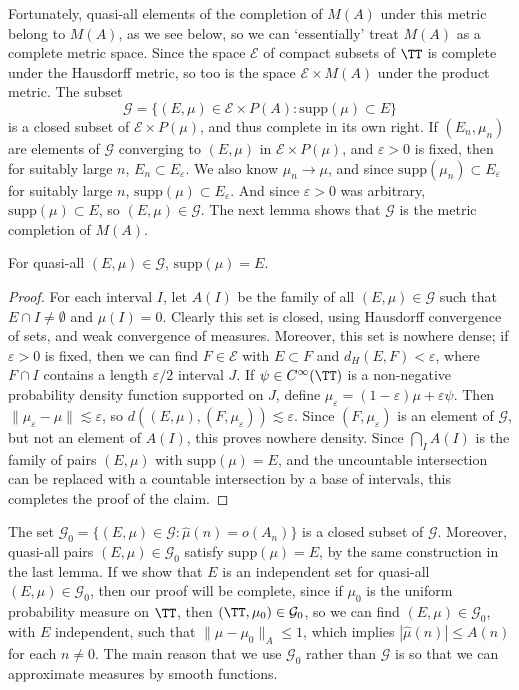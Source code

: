 Fortunately, quasi-all elements of the completion of $M(A)$ under this metric belong to $M(A)$, as we see below, so we can `essentially' treat $M(A)$ as a complete metric space. Since the space $\mathcal{E}$ of compact subsets of $\TT$ is complete under the Hausdorff metric, so too is the space $\mathcal{E} \times M(A)$ under the product metric. The subset
%
\[ \mathcal{G} = \{ (E,\mu) \in \mathcal{E} \times P(A): \text{supp}(\mu) \subset E \} \]
%
is a closed subset of $\mathcal{E} \times P(\mu)$, and thus complete in its own right. If $(E_n,\mu_n)$ are elements of $\mathcal{G}$ converging to $(E,\mu)$ in $\mathcal{E} \times P(\mu)$, and $\varepsilon > 0$ is fixed, then for suitably large $n$, $E_n \subset E_\varepsilon$. We also know $\mu_n \to \mu$, and since $\text{supp}(\mu_n) \subset E_\varepsilon$ for suitably large $n$, $\text{supp}(\mu) \subset E_\varepsilon$. And since $\varepsilon > 0$ was arbitrary, $\text{supp}(\mu) \subset E$, so $(E,\mu) \in \mathcal{G}$. The next lemma shows that $\mathcal{G}$ is the metric completion of $M(A)$.

\begin{lemma}
	For quasi-all $(E,\mu) \in \mathcal{G}$, $\text{supp}(\mu) = E$.
\end{lemma}
\begin{proof}
	For each interval $I$, let $A(I)$ be the family of all $(E,\mu) \in \mathcal{G}$ such that $E \cap I \neq \emptyset$ and $\mu(I) = 0$. Clearly this set is closed, using Hausdorff convergence of sets, and weak convergence of measures. Moreover, this set is nowhere dense; if $\varepsilon > 0$ is fixed, then we can find $F \in \mathcal{E}$ with $E \subset F$ and $d_H(E,F) < \varepsilon$, where $F \cap I$ contains a length $\varepsilon/2$ interval $J$. If $\psi \in C^\infty(\TT)$ is a non-negative probability density function supported on $J$, define $\mu_\varepsilon = (1 - \varepsilon) \mu + \varepsilon \psi$. Then $\| \mu_\varepsilon - \mu \| \lesssim \varepsilon$, so $d((E,\mu), (F,\mu_\varepsilon)) \lesssim \varepsilon$. Since $(F,\mu_\varepsilon)$ is an element of $\mathcal{G}$, but not an element of $A(I)$, this proves nowhere density. Since $\bigcap_I A(I)$ is the family of pairs $(E,\mu)$ with $\text{supp}(\mu) = E$, and the uncountable intersection can be replaced with a countable intersection by a base of intervals, this completes the proof of the claim.
\end{proof}

The set $\mathcal{G}_0 = \{ (E,\mu) \in \mathcal{G}: \widehat{\mu}(n) = o(A_n) \}$ is a closed subset of $\mathcal{G}$. Moreover, quasi-all pairs $(E,\mu) \in \mathcal{G}_0$ satisfy $\text{supp}(\mu) = E$, by the same construction in the last lemma. If we show that $E$ is an independent set for quasi-all $(E,\mu) \in \mathcal{G}_0$, then our proof will be complete, since if $\mu_0$ is the uniform probability measure on $\TT$, then $(\TT,\mu_0) \in \mathcal{G}_0$, so we can find $(E,\mu) \in \mathcal{G}_0$, with $E$ independent, such that $\| \mu - \mu_0 \|_A \leq 1$, which implies $|\widehat{\mu}(n)| \leq A(n)$ for each $n \neq 0$. The main reason that we use $\mathcal{G}_0$ rather than $\mathcal{G}$ is so that we can approximate measures by smooth functions.

